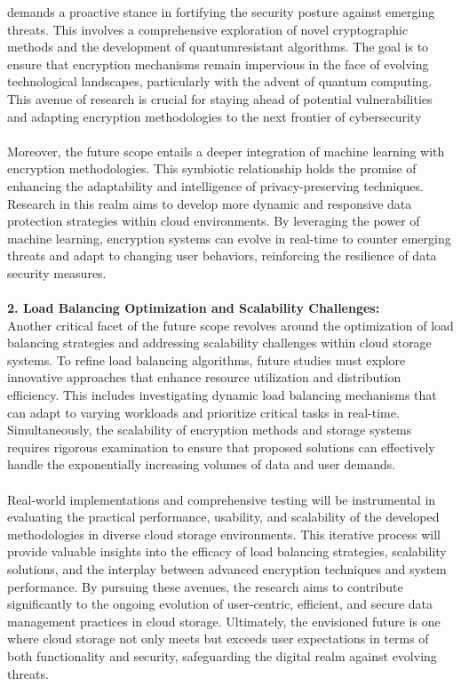 demands a proactive stance in fortifying the security posture against emerging threats. This involves a
comprehensive exploration of novel cryptographic methods and the development of quantumresistant algorithms. The goal is to ensure that encryption mechanisms remain impervious in the face
of evolving technological landscapes, particularly with the advent of quantum computing. This
avenue of research is crucial for staying ahead of potential vulnerabilities and adapting encryption
methodologies to the next frontier of cybersecurity
\\
\\
Moreover, the future scope entails a deeper integration of machine learning with encryption
methodologies. This symbiotic relationship holds the promise of enhancing the adaptability and
intelligence of privacy-preserving techniques. Research in this realm aims to develop more dynamic
and responsive data protection strategies within cloud environments. By leveraging the power of
machine learning, encryption systems can evolve in real-time to counter emerging threats and adapt
to changing user behaviors, reinforcing the resilience of data security measures. 
\\
\\
\textbf{2. Load Balancing Optimization and Scalability Challenges:}\\
Another critical facet of the future scope revolves around the optimization of load balancing strategies
and addressing scalability challenges within cloud storage systems. To refine load balancing
algorithms, future studies must explore innovative approaches that enhance resource utilization and
distribution efficiency. This includes investigating dynamic load balancing mechanisms that can adapt
to varying workloads and prioritize critical tasks in real-time. Simultaneously, the scalability of
encryption methods and storage systems requires rigorous examination to ensure that proposed
solutions can effectively handle the exponentially increasing volumes of data and user demands.
\\
\\
Real-world implementations and comprehensive testing will be instrumental in evaluating the
practical performance, usability, and scalability of the developed methodologies in diverse cloud
storage environments. This iterative process will provide valuable insights into the efficacy of load
balancing strategies, scalability solutions, and the interplay between advanced encryption techniques
and system performance. By pursuing these avenues, the research aims to contribute significantly to
the ongoing evolution of user-centric, efficient, and secure data management practices in cloud
storage. Ultimately, the envisioned future is one where cloud storage not only meets but exceeds user
expectations in terms of both functionality and security, safeguarding the digital realm against
evolving threats. 
\\
\\